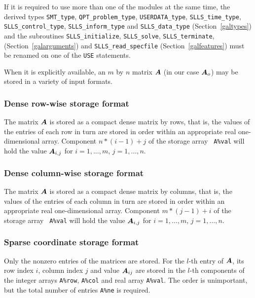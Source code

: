 \documentclass{galahad}
\newcommand{\packagename}{SLLS}
\begin{document}
\noindent
If it is required to use more than one of the modules at the same time, 
the derived types
{\tt SMT\_type},
{\tt QPT\_problem\_type},
{\tt USERDATA\-\_type},
{\tt \packagename\_time\_type},
{\tt \packagename\_control\_type},
{\tt \packagename\_inform\_type}
and
{\tt \packagename\_data\_type}
(Section~\ref{galtypes})
and the subroutines
{\tt \packagename\_initialize},
{\tt \packagename\_\-solve},
{\tt \packagename\_terminate},
(Section~\ref{galarguments})
and
{\tt \packagename\_read\_specfile}
(Section~\ref{galfeatures})
must be renamed on one of the {\tt USE} statements.


\galmatrix
When it is explicitly available, an $m$ by $n$ matrix ${\bm{A}}$ 
(in our case ${\bm{A}}_o$) may be stored in a variety of input formats.

\subsubsection{Dense row-wise storage format}\label{dense-row}
The matrix ${\bm{A}}$ is stored as a compact dense matrix by rows,
that is, the values of the entries of each row in turn are
stored in order within an appropriate real one-dimensional array.
Component $n \ast (i-1) + j$ of the storage array {\tt
  A\%val} will hold the value ${\bm{A}}_{i,j}$ for $i = 1, \ldots , m$, $j =
1, \ldots , n$.

\subsubsection{Dense column-wise storage format}\label{dense-column}
The matrix ${\bm{A}}$ is stored as a compact
dense matrix by columns, that is, the values of the entries of each column
in turn are stored in order within an appropriate real one-dimensional array.
Component $m \ast (j-1) + i$ of the storage array {\tt
  A\%val} will hold the value ${\bm{A}}_{i,j}$ for $i = 1, \ldots , m$, $j =
1, \ldots , n$.

\subsubsection{Sparse coordinate storage format}\label{coordinate}
Only the nonzero entries of the matrices are stored. For the $l$-th
entry of ${\bm{A}}$, its row index $i$, column index $j$ and value
${\bm{A}}_{ij}$ are stored in the $l$-th components of the integer arrays
{\tt A\%row}, {\tt A\%col} and real array {\tt A\%val}.
The order is unimportant, but the total number of entries {\tt A\%ne} is
required.
\end{document}
